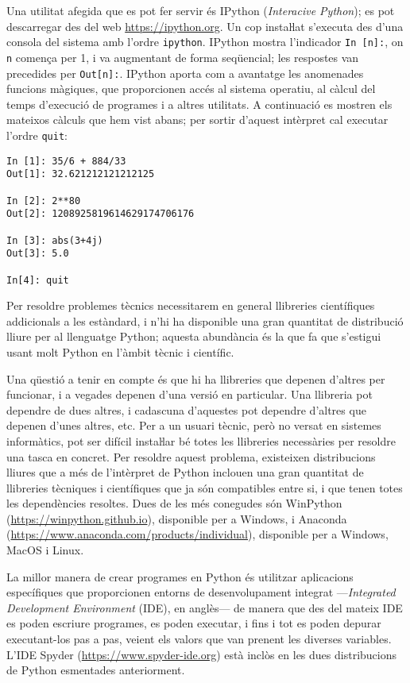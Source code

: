 Una utilitat afegida que es pot fer servir és IPython (\textit{Interacive Python}); es pot descarregar des del web \href{https://ipython.org/}{https:/\!\!/ipython.org}. Un cop instaŀlat s'executa des d'una consola del sistema amb l'ordre \texttt{ipython}. IPython mostra l'indicador \texttt{In [n]:}, on \texttt{n} comença per 1, i va augmentant de forma seqüencial; les respostes van precedides per \texttt{Out[n]:}. IPython aporta com a avantatge les anomenades funcions màgiques, que proporcionen accés al sistema operatiu, al càlcul del temps d'execució de programes i a altres utilitats. A continuació es mostren els mateixos càlculs que hem vist abans; per sortir d'aquest intèrpret cal executar l'ordre \texttt{quit}:
\begin{lstlisting}
In [1]: 35/6 + 884/33
Out[1]: 32.621212121212125

In [2]: 2**80
Out[2]: 1208925819614629174706176

In [3]: abs(3+4j)
Out[3]: 5.0

In[4]: quit
\end{lstlisting}

Per resoldre problemes tècnics necessitarem en general llibreries científiques addicionals a les estàndard,  i n'hi ha disponible una gran quantitat de distribució lliure  per al llenguatge Python; aquesta abundància és la que fa que s'estigui usant molt Python en l'àmbit tècnic i científic.

Una qüestió a tenir en compte és que hi ha llibreries que depenen d'altres per funcionar, i a vegades  depenen d'una versió en particular. Una llibreria pot dependre de dues altres, i cadascuna d'aquestes pot dependre d'altres que depenen d'unes altres, etc. Per a un usuari tècnic, però no versat en sistemes informàtics, pot ser difícil instaŀlar bé totes les llibreries necessàries per resoldre una tasca en concret. Per resoldre aquest problema, existeixen distribucions lliures que a més de l'intèrpret de Python inclouen una gran quantitat de llibreries tècniques i científiques que ja són compatibles entre si, i que tenen totes les dependències resoltes. Dues de les més conegudes són WinPython (\href{https://winpython.github.io/}{https:/\!\!/winpython.github.io}), disponible  per a Windows, i
Anaconda (\href{https://www.anaconda.com/products/individual}{https:/\!\!/www.anaconda.com/products/individual}), disponible per a Windows, MacOS i Linux.



La millor manera de crear programes en Python és utilitzar aplicacions específiques que proporcionen entorns  de desenvolupament integrat ---\textit{Integrated Development Environment} (IDE), en anglès--- de manera que des del mateix IDE es poden escriure programes, es poden executar, i fins i tot es poden depurar executant-los pas a pas, veient els valors que van prenent les diverses variables. L'IDE Spyder (\href{https://www.spyder-ide.org/}{https:/\!\!/www.spyder-ide.org}) està inclòs en les dues distribucions de Python esmentades anteriorment. 

